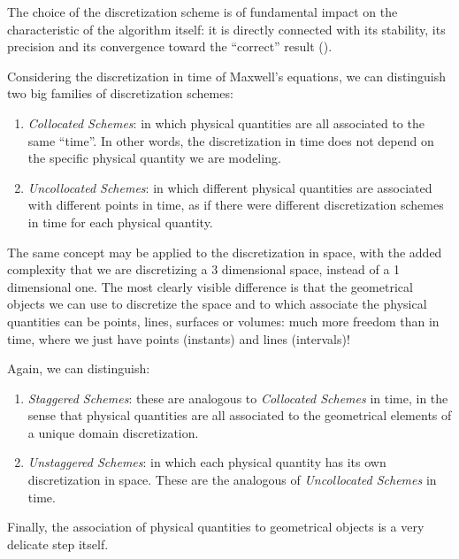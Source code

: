 The choice of the discretization scheme is of fundamental impact on
the characteristic of the algorithm itself: it is directly connected
with its stability, its precision and its convergence toward the
``correct'' result ().

Considering the discretization in time of Maxwell's equations, we can
distinguish two big families of discretization schemes:
\begin{enumerate}
\item
  \emph{Collocated Schemes}: in which physical quantities are all
  associated to the same ``time''. In other words, the discretization
  in time does not depend on the specific physical quantity we are
  modeling.
\item
  \emph{Uncollocated Schemes}: in which different physical quantities
  are associated with different points in time, as if there were
  different discretization schemes in time for each physical quantity.
\end{enumerate}

The same concept may be applied to the discretization in space, with
the added complexity that we are discretizing a 3 dimensional space,
instead of a 1 dimensional one. The most clearly visible difference is
that the geometrical objects we can use to discretize the space and to
which associate the physical quantities can be points, lines, surfaces
or volumes: much more freedom than in time, where we just have points
(instants) and lines (intervals)!

Again, we can distinguish:
\begin{enumerate}
\item
  \emph{Staggered Schemes}: these are analogous to \emph{Collocated
  Schemes} in time, in the sense that physical quantities are all
  associated to the geometrical elements of a unique domain
  discretization.
\item
  \emph{Unstaggered Schemes}: in which each physical quantity has its
  own discretization in space. These are the analogous of
  \emph{Uncollocated Schemes} in time.
\end{enumerate}

Finally, the association of physical quantities to geometrical objects
is a very delicate step itself.


